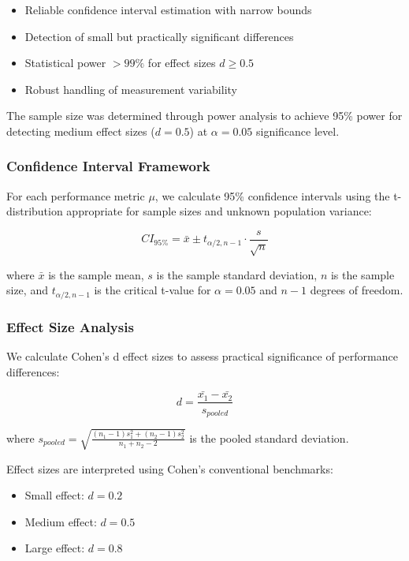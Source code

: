 \documentclass[manuscript]{acmart}
\begin{document}
\begin{itemize}
    \item Reliable confidence interval estimation with narrow bounds
    \item Detection of small but practically significant differences
    \item Statistical power $>99\%$ for effect sizes $d \geq 0.5$
    \item Robust handling of measurement variability
\end{itemize}

The sample size was determined through power analysis to achieve 95\% power for detecting medium effect sizes ($d = 0.5$) at $\alpha = 0.05$ significance level.

\subsubsection{Confidence Interval Framework}
For each performance metric $\mu$, we calculate 95\% confidence intervals using the t-distribution appropriate for sample sizes and unknown population variance:

\begin{equation}
CI_{95\%} = \bar{x} \pm t_{\alpha/2,n-1} \cdot \frac{s}{\sqrt{n}}
\end{equation}

where $\bar{x}$ is the sample mean, $s$ is the sample standard deviation, $n$ is the sample size, and $t_{\alpha/2,n-1}$ is the critical t-value for $\alpha = 0.05$ and $n-1$ degrees of freedom.

\subsubsection{Effect Size Analysis}
We calculate Cohen's d effect sizes to assess practical significance of performance differences:

\begin{equation}
d = \frac{\bar{x_1} - \bar{x_2}}{s_{pooled}}
\end{equation}

where $s_{pooled} = \sqrt{\frac{(n_1-1)s_1^2 + (n_2-1)s_2^2}{n_1+n_2-2}}$ is the pooled standard deviation.

Effect sizes are interpreted using Cohen's conventional benchmarks:
\begin{itemize}
    \item Small effect: $d = 0.2$
    \item Medium effect: $d = 0.5$
    \item Large effect: $d = 0.8$
\end{itemize}
\end{document}
